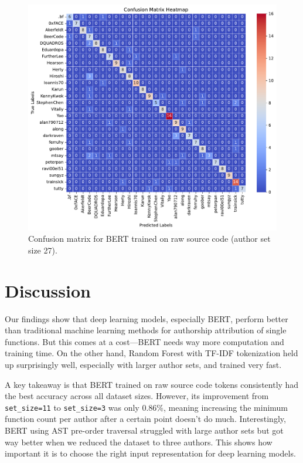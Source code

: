 \documentclass[conference]{IEEEtran}
\begin{document}
\begin{figure}[!t]
    \centering
    \includegraphics[width=\columnwidth]{figures/conf_matrix_sourcode_bert_ts27.pdf}
    \caption{Confusion matrix for BERT trained on raw source code (author set size 27).}
    \label{fig:conf_matrix_bert}
\end{figure}

\section{Discussion}

Our findings show that deep learning models, especially BERT, perform better than traditional machine learning methods for authorship attribution 
of single functions. But this comes at a cost—BERT needs way more computation and training time. On the other hand, Random Forest with TF-IDF 
tokenization held up surprisingly well, especially with larger author sets, and trained very fast.

A key takeaway is that BERT trained on raw source code tokens consistently had the best accuracy across all dataset sizes. However, 
its improvement from \texttt{set\_size=11} to \texttt{set\_size=3} was only 0.86\%, meaning increasing the minimum function count per author 
after a certain point doesn’t do much. Interestingly, BERT using AST pre-order traversal struggled with large author sets but got way better 
when we reduced the dataset to three authors. This shows how important it is to choose the right input representation for deep learning models.
\end{document}
